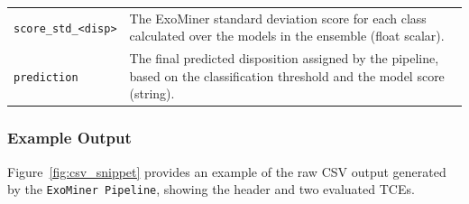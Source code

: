 \documentclass{article}
\newcommand{\ExoMinerPipeline}{\texttt{ExoMiner Pipeline}}
\begin{document}
\begin{table}[htbp]
\begin{tabularx}{\textwidth}{@{} l X @{}}
        \texttt{score\_std\_<disp>} & The ExoMiner standard deviation score for each class calculated over the models in the ensemble (float scalar). \\
        \texttt{prediction} & The final predicted disposition assigned by the pipeline, based on the classification threshold and the model score (string). \\
        \bottomrule
    \end{tabularx}
\end{table}

\subsubsection*{Example Output}
Figure~\ref{fig:csv_snippet} provides an example of the raw CSV output generated by the \ExoMinerPipeline, showing the header and two evaluated TCEs.
\end{document}
